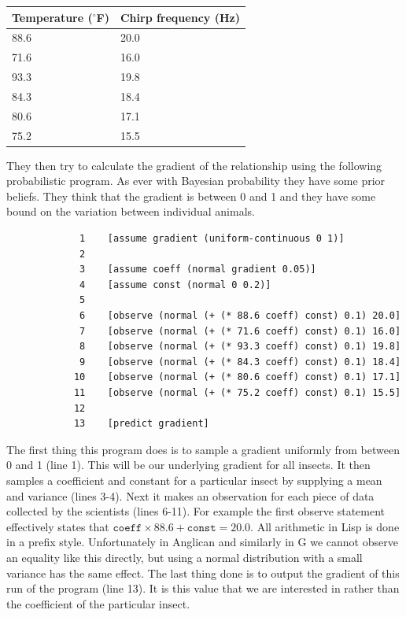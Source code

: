 \documentclass[a4paper]{article}
\begin{document}
\begin{center}
	\def\arraystretch{1.3}
	\begin{tabular}{l|l}
		Temperature (\(^\circ\)F) & Chirp frequency (Hz) \\
		\hline
		88.6 & 20.0 \\
		71.6 & 16.0 \\
		93.3 & 19.8 \\
		84.3 & 18.4 \\
		80.6 & 17.1 \\
		75.2 & 15.5
	\end{tabular}
\end{center}
They then try to calculate the gradient of the relationship using the following probabilistic program. As ever with Bayesian probability they have some prior beliefs. They think that the gradient is between 0 and 1 and they have some bound on the variation between individual animals.

\begin{center}
	\begin{varwidth}{\linewidth}
		\small
		\begin{verbatim}
			 1    [assume gradient (uniform-continuous 0 1)]
			 2    
			 3    [assume coeff (normal gradient 0.05)]
			 4    [assume const (normal 0 0.2)]
			 5    
			 6    [observe (normal (+ (* 88.6 coeff) const) 0.1) 20.0]
			 7    [observe (normal (+ (* 71.6 coeff) const) 0.1) 16.0]
			 8    [observe (normal (+ (* 93.3 coeff) const) 0.1) 19.8]
			 9    [observe (normal (+ (* 84.3 coeff) const) 0.1) 18.4]
			10    [observe (normal (+ (* 80.6 coeff) const) 0.1) 17.1]
			11    [observe (normal (+ (* 75.2 coeff) const) 0.1) 15.5]
			12    
			13    [predict gradient]
		\end{verbatim}
	\end{varwidth}
\end{center}
The first thing this program does is to sample a gradient uniformly from between 0 and 1 (line 1). This will be our underlying gradient for all insects. It then samples a coefficient and constant for a particular insect by supplying a mean and variance (lines 3-4). Next it makes an observation for each piece of data collected by the scientists (lines 6-11). For example the first observe statement effectively states that \(\texttt{coeff} \times 88.6 + \texttt{const} = 20.0\). All arithmetic in Lisp is done in a prefix style. Unfortunately in Anglican and similarly in G we cannot observe an equality like this directly, but using a normal distribution with a small variance has the same effect. The last thing done is to output the gradient of this run of the program (line 13). It is this value that we are interested in rather than the coefficient of the particular insect.
\end{document}
